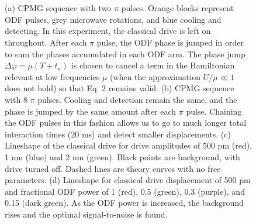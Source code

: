 \documentclass[aps,prl,twocolumn,superscriptaddress,floatfix]{revtex4-1}
\begin{document}
\begin{figure}[h]
  \\
  \\
  \hfill
  \caption{(a) CPMG sequence with two $\pi$ pulses. Orange blocks represent ODF pulses, grey microwave rotations, and blue cooling and detecting. In this experiment, the classical drive is left on throughout. After each $\pi$ pulse, the ODF phase is jumped in order to sum the phases accumulated in each ODF arm. The phase jump $\Delta\varphi = \mu(T+t_{\pi})$ is chosen to cancel a term in the Hamiltonian relevant at low frequencies $\mu$ (when the approximation  $U/\mu \ll 1$ does not hold) so that Eq. 2 remains valid. (b) CPMG sequence with 8 $\pi$ pulses. Cooling and detection remain the same, and the phase is jumped by the same amount after each $\pi$ pulse. Chaining the ODF pulses in this fashion allows us to go to much longer total interaction times (20 ms) and detect smaller displacements. (c) Lineshape of the classical drive for drive amplitudes of 500 pm (red), 1 nm (blue) and 2 nm (green). Black points are background, with drive turned off. Dashed lines are theory curves with no free parameters.  (d) Lineshape for classical drive displacement of 500 pm and  fractional ODF power of 1 (red), 0.5 (green), 0.3 (purple), and 0.15 (dark green). As the ODF power is increased, the background rises and the optimal signal-to-noise is found.}\label{Fig Ramsey}
\end{figure}
\end{document}
